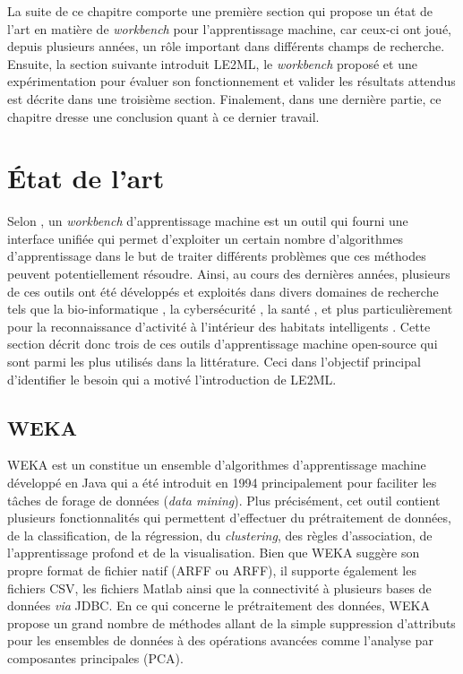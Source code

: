 La suite de ce chapitre comporte une première section qui propose un état de l'art en matière de \textit{workbench} pour l'apprentissage machine, car ceux-ci ont joué, depuis plusieurs années, un rôle important dans différents champs de recherche. Ensuite, la section suivante introduit \acs{LE2ML}, le \textit{workbench} proposé et une expérimentation pour évaluer son fonctionnement et valider les résultats attendus est décrite dans une troisième section. Finalement, dans une dernière partie, ce chapitre dresse une conclusion quant à ce dernier travail.

\section{État de l'art}

Selon \cite{Langlois2008}, un \textit{workbench} d'apprentissage machine est un outil qui fourni une interface unifiée qui permet d'exploiter un certain nombre d'algorithmes d'apprentissage dans le but de traiter différents problèmes que ces méthodes peuvent potentiellement résoudre. Ainsi, au cours des dernières années, plusieurs de ces outils ont été développés et exploités dans divers domaines de recherche tels que la bio-informatique \citep{Larranaga2006}, la cybersécurité \citep{Handa2019}, la santé \citep{Rajkomar2019}, et plus particulièrement pour la reconnaissance d'activité à l'intérieur des habitats intelligents \citep{Ramirez-Prado2019}. Cette section décrit donc trois de ces outils d'apprentissage machine open-source qui sont parmi les plus utilisés dans la littérature. Ceci dans l'objectif principal d'identifier le besoin qui a motivé l'introduction de \acs{LE2ML}.

\subsection{WEKA}

\acs{WEKA} est un constitue un ensemble d'algorithmes d'apprentissage machine développé en Java qui a été introduit en 1994 principalement pour faciliter les tâches de forage de données (\textit{data mining}). Plus précisément, cet outil contient plusieurs fonctionnalités qui permettent d'effectuer du prétraitement de données, de la classification, de la régression, du \textit{clustering}, des règles d'association, de l'apprentissage profond et de la visualisation. Bien que \acs{WEKA} suggère son propre format de fichier natif (\acl{ARFF} ou \acs{ARFF}), il supporte également les fichiers \acs{CSV}, les fichiers Matlab ainsi que la connectivité à plusieurs bases de données \textit{via} \ac{JDBC}. En ce qui concerne le prétraitement des données, \acs{WEKA} propose un grand nombre de méthodes allant de la simple suppression d'attributs pour les ensembles de données à des opérations avancées comme l'analyse par composantes principales (\acs{PCA}).

